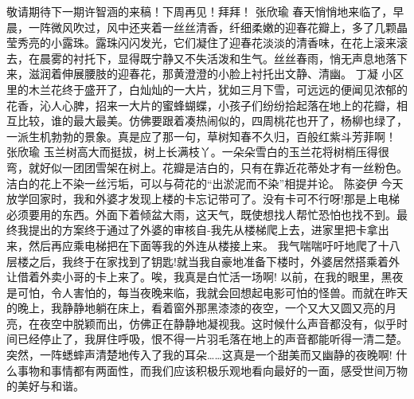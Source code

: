 {}敬请期待下一期许智涵的来稿！下周再见！拜拜！\markdownRendererInterblockSeparator
{}\markdownRendererInterblockSeparator
{}张欣瑜\markdownRendererInterblockSeparator
{}春天悄悄地来临了，早晨，一阵微风吹过，风中还夹着一丝丝清香，纤细柔嫩的迎春花瓣上，多了几颗晶莹秀亮的小露珠。露珠闪闪发光，它们凝住了迎春花淡淡的清香味，在花上滚来滚去，在晨雾的衬托下，显得既宁静又不失活泼和生气。丝丝春雨，悄无声息地落下来，滋润着伸展腰肢的迎春花，那黄澄澄的小脸上衬托出文静、清幽。\markdownRendererInterblockSeparator
{}\markdownRendererInterblockSeparator
{}丁凝\markdownRendererInterblockSeparator
{}小区里的木兰花终于盛开了，白灿灿的一大片，犹如三月下雪，可远远的便闻见浓郁的花香，沁人心脾，招来一大片的蜜蜂蝴蝶，小孩子们纷纷拾起落在地上的花瓣，相互比较，谁的最大最美。仿佛要跟着凑热闹似的，四周桃花也开了，杨柳也绿了，一派生机勃勃的景象。真是应了那一句，草树知春不久归，百般红紫斗芳菲啊！\markdownRendererInterblockSeparator
{}\markdownRendererInterblockSeparator
{}张欣瑜\markdownRendererInterblockSeparator
{}玉兰树高大而挺拔，树上长满枝丫。一朵朵雪白的玉兰花将树梢压得很弯，就好似一团团雪架在树上。花瓣是洁白的，只有在靠近花蒂处才有一丝粉色。洁白的花上不染一丝污垢，可以与荷花的“出淤泥而不染”相提并论。 \markdownRendererInterblockSeparator
{}\markdownRendererInterblockSeparator
{}陈姿伊\markdownRendererInterblockSeparator
{}今天放学回家时，我和外婆才发现上楼的卡忘记带可了。没有卡可不行呀!那是上电梯必须要用的东西。外面下着倾盆大雨，这天气，既使想找人帮忙恐怕也找不到。最终我提出的方案终于通过了外婆的审核自-我先从楼梯爬上去，进家里把卡拿出来，然后再应乘电梯把在下面等我的外连从楼接上来。\markdownRendererInterblockSeparator
{}我气喘喘吁吁地爬了十八层楼之后，我终于在家找到了钥匙!就当我自豪地准备下楼时，外婆居然搭乘着外让借着外卖小哥的卡上来了。唉，我真是白忙活一场啊!\markdownRendererInterblockSeparator
{}\markdownRendererInterblockSeparator
{}以前，在我的眼里，黑夜是可怕，令人害怕的，每当夜晚来临，我就会回想起电影可怕的怪兽。而就在昨天的晚上，我静静地躺在床上，看着窗外那黑漆漆的夜空，一个又大又圆又亮的月亮，在夜空中脱颖而出，仿佛正在静静地凝视我。这时候什么声音都没有，似乎时间已经停止了，我屏住呼吸，恨不得一片羽毛落在地上的声音都能听得一清二楚。突然，一阵蟋蟀声清楚地传入了我的耳朵……这真是一个甜美而又幽静的夜晚啊!\markdownRendererInterblockSeparator
{}什么事物和事情都有两面性，而我们应该积极乐观地看向最好的一面，感受世间万物的美好与和谐。\markdownRendererInterblockSeparator
